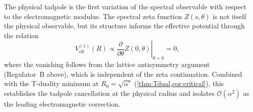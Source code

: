 The physical tadpole is the first variation of the spectral observable
with respect to the electromagnetic modulus. The spectral zeta function
$Z(s,\theta)$ is not itself the physical observable, but its structure
informs the effective potential through the relation
\[
  V_{\mathrm{eff}}^{(1)}(R)
    \propto \left.\frac{\partial}{\partial\theta}
    Z(0,\theta)\right|_{\theta=0} = 0,
\]
where the vanishing follows from the lattice antisymmetry argument
(Regulator~B above), which is independent of the zeta continuation.
Combined with the T-duality minimum at $R_0=\sqrt{\alpha'}$
(\cref{thm:Tdual,cor:critical}), this establishes the tadpole
cancellation at the physical radius and isolates $\mathcal{O}(\alpha^2)$
as the leading electromagnetic correction.

